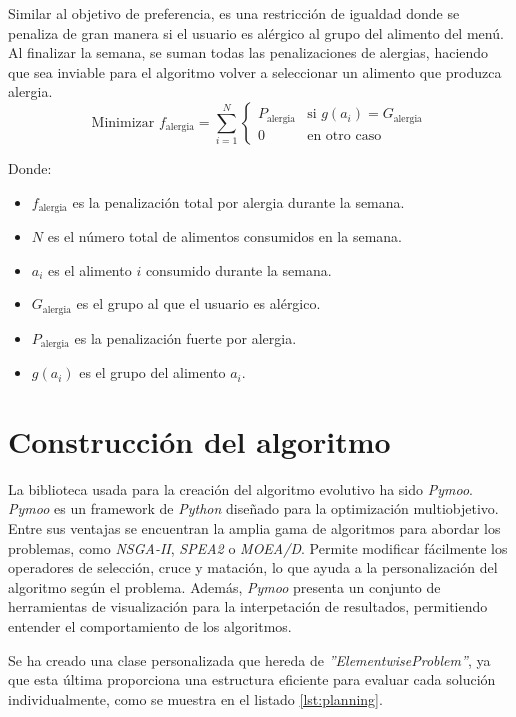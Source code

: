 Similar al objetivo de preferencia, es una restricción de igualdad donde se penaliza de gran manera si el usuario es alérgico al grupo del alimento del menú. Al finalizar la semana, se suman todas las penalizaciones de alergias, haciendo que sea inviable para el algoritmo volver a seleccionar un alimento que produzca alergia.
\[
\text{Minimizar } f_{\text{alergia}} = \sum_{i=1}^{N} 
\begin{cases} 
P_{\text{alergia}} & \text{si } g(a_i) = G_{\text{alergia}} \\
0 & \text{en otro caso}
\end{cases}
\]
\begin{small}
    Donde:
    \begin{itemize}
    \item \( f_{\text{alergia}} \) es la penalización total por alergia durante la semana.
    \item \( N \) es el número total de alimentos consumidos en la semana.
    \item \( a_i \) es el alimento \( i \) consumido durante la semana.
    \item \( G_{\text{alergia}} \) es el grupo al que el usuario es alérgico.
    \item \( P_{\text{alergia}} \) es la penalización fuerte por alergia.
    \item \( g(a_i) \) es el grupo del alimento \( a_i \).
    \end{itemize}
\end{small}

\section{Construcción del algoritmo}
\label{ch:explicacion-algoritmo}

La biblioteca usada para la creación del algoritmo evolutivo ha sido \textit{Pymoo}. \textit{Pymoo} es un framework de \textit{Python} diseñado para la optimización multiobjetivo. Entre sus ventajas se encuentran la amplia gama de algoritmos para abordar los problemas, como \textit{NSGA-II}, \textit{SPEA2} o \textit{MOEA/D}. Permite modificar fácilmente los operadores de selección, cruce y matación, lo que ayuda a la personalización del algoritmo según el problema. Además, \textit{Pymoo} presenta un conjunto de herramientas de visualización para la interpetación de resultados, permitiendo entender el comportamiento de los algoritmos.~\cite{pymoo}

Se ha creado una clase personalizada que hereda de \textit{''ElementwiseProblem''}, ya que esta última proporciona una estructura eficiente para evaluar cada solución individualmente, como se muestra en el listado \ref{lst:planning}.

